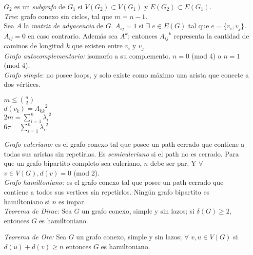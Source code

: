 \documentclass[titlepage,a4paper,12pt,twoside]{article}
\begin{document}
$G_{2}$ es un \textit{subgrafo} de $G_{1}$ si $V(G_{2}) \subset V(G_{1})$ y $E(G_{2}) \subset E(G_{1})$.\\

\textit{Tree}: grafo conexo sin ciclos, tal que $m = n - 1$.\\

Sea $A$ la \textit{matriz de adyacencia} de $G$. $A_{ij} = 1$ si $ \exists $ $ e \in E(G)$ tal que $e = \{v_{i},v_{j}\}$. $A_{ij} = 0$ en caso contrario. Además sea $A^k$; entonces ${A_{ij}}^k$ representa la cantidad de caminos de longitud $k$ que existen entre $v_{i}$ y $v_{j}$.\\

\textit{Grafo autocomplementario:} isomorfo a su complemento. $n = 0$ (mod 4) o $n = 1$ (mod 4).\\

\textit{Grafo simple}: no posee loops, y solo existe como máximo una arista que conecte a dos vértices.

\begin{center}
$\displaystyle m \leqslant \binom{n}{2}$\\
$ $\\
$d(v_{k}) = {A_{kk}}^2$\\
$ $\\
$2m = \displaystyle \sum_{i=1}^{n} {\lambda_{i}}^2$\\
$ $\\
$6 \tau = \displaystyle \sum_{i=1}^{n} {\lambda_{i}}^2 $\\
\end{center}

\textit{Grafo euleriano:} es el grafo conexo tal que posee un path cerrado que contiene a todas sus aristas sin repetirlas. Es \textit{semieuleriano} si el path no es cerrado. Para que un grafo bipartito completo sea euleriano, $n$ debe ser par. Y $\forall $ $ v \in V(G), d(v) = 0$ (mod 2).\\

\textit{Grafo hamiltoniano:} es el grafo conexo tal que posee un path cerrado que contiene a todos sus vertices sin repetirlos. Ningún grafo bipartito es hamiltoniano si $n$ es impar.\\

\textit{Teorema de Dirac:} Sea $G$ un grafo conexo, simple y sin lazos; si $\delta (G) \geqslant 2$, entonces $G$ es hamiltoniano.

\textit{Teorema de Ore:} Sea $G$ un grafo conexo, simple y sin lazos; $\forall $ $v,u \in V(G)$ si $d(u) + d(v) \geqslant n$ entonces $G$ es hamiltoniano.
\end{document}
